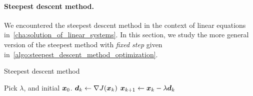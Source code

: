 \paragraph{Steepest descent method.}
We encountered the steepest descent method in the context of linear equations in~\cref{cha:solution_of_linear_systems}.
In this section, we study the more general version of the steepest method with \emph{fixed step} given in~\cref{algo:steepest_descent_method_optimization}.
\begin{algorithm}
\caption{Steepest descent method}%
\label{algo:steepest_descent_method_optimization}%
\begin{algorithmic}[1]
    \State Pick $\lambda$, and initial $\mathbf{\boldsymbol{x}}_0$.
        \State $\mathbf{\boldsymbol{d}}_k \gets \nabla J(\mathbf{\boldsymbol{x}}_k)$
        \State $\mathbf{\boldsymbol{x}}_{k+1} \gets \mathbf{\boldsymbol{x}}_{k} - \lambda \mathbf{\boldsymbol{d}}_k$
    \EndFor
\end{algorithmic}
\end{algorithm}

